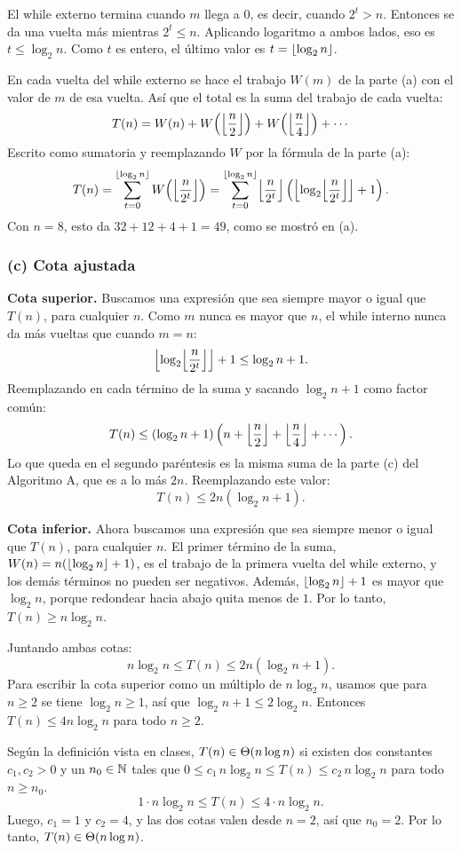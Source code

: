 El while externo termina cuando $m$ llega a $0$, es decir, cuando $2^t > n$. Entonces se
da una vuelta más mientras $2^t \le n$. Aplicando logaritmo a ambos lados, eso es
$t \le \log_2 n$. Como $t$ es entero, el último valor es $t = \floor{\log_2 n}$.

En cada vuelta del while externo se hace el trabajo $W(m)$ de la parte (a) con el valor
de $m$ de esa vuelta. Así que el total es la suma del trabajo de cada vuelta:
\[
  T(n) = W(n) + W\!\left(\floor*{\frac{n}{2}}\right) + W\!\left(\floor*{\frac{n}{4}}\right)
         + \cdots
\]
Escrito como sumatoria y reemplazando $W$ por la fórmula de la parte (a):
\[
  T(n) = \sum_{t=0}^{\floor{\log_2 n}} W\!\left(\floor*{\frac{n}{2^t}}\right)
       = \sum_{t=0}^{\floor{\log_2 n}} \floor*{\frac{n}{2^t}}
         \left( \floor*{\log_2 \floor*{\frac{n}{2^t}}} + 1 \right).
\]
Con $n = 8$, esto da $32 + 12 + 4 + 1 = 49$, como se mostró en (a).

\subsubsection*{(c) Cota ajustada}

\textbf{Cota superior.} Buscamos una expresión que sea siempre mayor o igual que $T(n)$,
para cualquier $n$. Como $m$ nunca es mayor que $n$, el while interno nunca da más
vueltas que cuando $m = n$:
\[
  \floor*{\log_2 \floor*{\frac{n}{2^t}}} + 1 \le \log_2 n + 1.
\]
Reemplazando en cada término de la suma y sacando $\log_2 n + 1$ como factor común:
\[
  T(n) \le \left( \log_2 n + 1 \right) \left( n + \floor*{\frac{n}{2}}
       + \floor*{\frac{n}{4}} + \cdots \right).
\]
Lo que queda en el segundo paréntesis es la misma suma de la parte (c) del Algoritmo A,
que es a lo más $2n$. Reemplazando este valor:
\[
  T(n) \le 2n \left( \log_2 n + 1 \right).
\]

\textbf{Cota inferior.} Ahora buscamos una expresión que sea siempre menor o igual que
$T(n)$, para cualquier $n$. El primer término de la suma, $W(n) = n(\floor{\log_2 n} + 1)$,
es el trabajo de la primera vuelta del while externo, y los demás términos no pueden ser
negativos. Además, $\floor{\log_2 n} + 1$ es mayor que $\log_2 n$, porque redondear hacia
abajo quita menos de $1$. Por lo tanto, $T(n) \ge n \log_2 n$.

Juntando ambas cotas:
\[
  n \log_2 n \le T(n) \le 2n \left( \log_2 n + 1 \right).
\]
Para escribir la cota superior como un múltiplo de $n\log_2 n$, usamos que para $n \ge 2$
se tiene $\log_2 n \ge 1$, así que $\log_2 n + 1 \le 2\log_2 n$. Entonces
$T(n) \le 4n\log_2 n$ para todo $n \ge 2$.

Según la definición vista en clases, $T(n) \in \T{n \log n}$ si existen dos constantes
$c_1, c_2 > 0$ y un $n_0 \in \N$ tales que
$0 \le c_1\, n\log_2 n \le T(n) \le c_2\, n\log_2 n$ para todo $n \ge n_0$.
\[
  1 \cdot n\log_2 n \le T(n) \le 4 \cdot n\log_2 n.
\]
Luego, $c_1 = 1$ y $c_2 = 4$, y las dos cotas valen desde $n = 2$, así que $n_0 = 2$. Por
lo tanto, $T(n) \in \T{n \log n}$.
